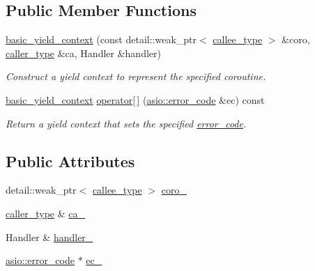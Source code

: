 \subsection*{Public Member Functions}
\begin{DoxyCompactItemize}
\item 
\hyperlink{classasio_1_1basic__yield__context_a9f14fbbf643163ee3152972d56907ede}{basic\+\_\+yield\+\_\+context} (const detail\+::weak\+\_\+ptr$<$ \hyperlink{classasio_1_1basic__yield__context_afd9613f4a7188a89d349a3aa34b88220}{callee\+\_\+type} $>$ \&coro, \hyperlink{classasio_1_1basic__yield__context_a3f865e7e2e46345effce8163336f1c8e}{caller\+\_\+type} \&ca, Handler \&handler)
\begin{DoxyCompactList}\small\item\em Construct a yield context to represent the specified coroutine. \end{DoxyCompactList}\item 
\hyperlink{classasio_1_1basic__yield__context}{basic\+\_\+yield\+\_\+context} \hyperlink{classasio_1_1basic__yield__context_acbeadcb22a1ff58d5a8edffec2ecb5fa}{operator\mbox{[}$\,$\mbox{]}} (\hyperlink{classasio_1_1error__code}{asio\+::error\+\_\+code} \&ec) const 
\begin{DoxyCompactList}\small\item\em Return a yield context that sets the specified \hyperlink{classasio_1_1error__code}{error\+\_\+code}. \end{DoxyCompactList}\end{DoxyCompactItemize}
\subsection*{Public Attributes}
\begin{DoxyCompactItemize}
\item 
detail\+::weak\+\_\+ptr$<$ \hyperlink{classasio_1_1basic__yield__context_afd9613f4a7188a89d349a3aa34b88220}{callee\+\_\+type} $>$ \hyperlink{classasio_1_1basic__yield__context_a67c4e21f4a7b551f4cba8370e1640ffc}{coro\+\_\+}
\item 
\hyperlink{classasio_1_1basic__yield__context_a3f865e7e2e46345effce8163336f1c8e}{caller\+\_\+type} \& \hyperlink{classasio_1_1basic__yield__context_a769cdefc3e600f3c6a29f24d0ada0523}{ca\+\_\+}
\item 
Handler \& \hyperlink{classasio_1_1basic__yield__context_a515fcba3f44460975a5da42295ca3c47}{handler\+\_\+}
\item 
\hyperlink{classasio_1_1error__code}{asio\+::error\+\_\+code} $\ast$ \hyperlink{classasio_1_1basic__yield__context_a4b515d20df406ce69f526bf26b0fbdd8}{ec\+\_\+}
\end{DoxyCompactItemize}


